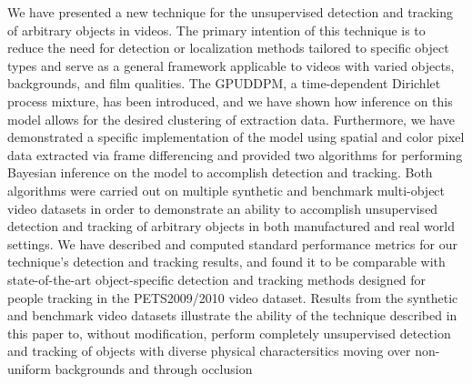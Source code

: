 \documentclass[twocolumn, final]{svjour3}
\begin{document}
We have presented a new technique for the unsupervised detection and tracking of arbitrary objects in videos. The primary intention of this technique is to reduce the need for detection or localization methods tailored to specific object types and serve as a general framework applicable to videos with varied objects, backgrounds, and film qualities. The GPUDDPM, a time-dependent Dirichlet process mixture, has been introduced, and we have shown how inference on this model allows for the desired clustering of extraction data. Furthermore, we have demonstrated a specific implementation of the model using spatial and color pixel data extracted via frame differencing and provided two algorithms for performing Bayesian inference on the model to accomplish detection and tracking. Both algorithms were carried out on multiple synthetic and benchmark multi-object video datasets in order to demonstrate an ability to accomplish unsupervised detection and tracking of arbitrary objects in both manufactured and real world settings. We have described and computed standard performance metrics for our technique's detection and tracking results, and found it to be comparable with state-of-the-art object-specific detection and tracking methods designed for people tracking in the PETS2009/2010 video dataset. Results from the synthetic and benchmark video datasets illustrate the ability of the technique described in this paper to, without modification, perform completely unsupervised detection and tracking of objects with diverse physical charactersitics moving over non-uniform backgrounds and through occlusion




















\begin{small}

 
\end{small}
\end{document}
